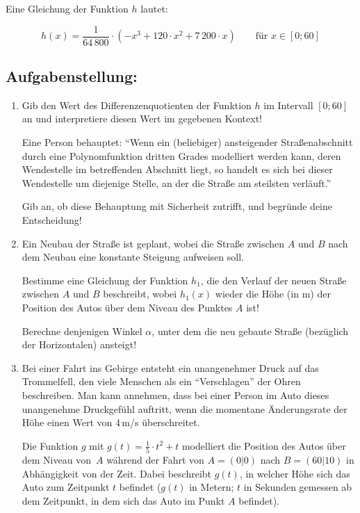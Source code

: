 \begin{langesbeispiel}
Eine Gleichung der Funktion $h$ lautet:

\[h(x)=\frac{1}{64\,800}\cdot(-x^3+120\cdot x^2+7\,200\cdot x) \qquad \text{für } x\in [0; 60] \]

\subsection{Aufgabenstellung:}

\begin{enumerate}
	\item Gib den Wert des Differenzenquotienten der Funktion $h$ im Intervall $[0; 60]$ an und interpretiere diesen Wert im gegebenen Kontext! \leer
	
Eine Person behauptet: "`Wenn ein (beliebiger) ansteigender Straßenabschnitt durch eine Polynomfunktion dritten Grades modelliert werden kann, deren Wendestelle im betreffenden
Abschnitt liegt, so handelt es sich bei dieser Wendestelle um diejenige Stelle, an der die Straße am steilsten verläuft."'\leer

Gib an, ob diese Behauptung mit Sicherheit zutrifft, und begründe deine Entscheidung!

\item Ein Neubau der Straße ist geplant, wobei die Straße zwischen $A$ und $B$ nach dem Neubau
eine konstante Steigung aufweisen soll.\leer

  Bestimme eine Gleichung der Funktion $h_1$, die den Verlauf der neuen Straße zwischen $A$ und $B$ beschreibt, wobei $h_1(x)$ wieder die Höhe (in m) der Position des Autos über
dem Niveau des Punktes $A$ ist!\leer

Berechne denjenigen Winkel $\alpha$, unter dem die neu gebaute Straße (bezüglich der Horizontalen) ansteigt!

\item Bei einer Fahrt ins Gebirge entsteht ein unangenehmer Druck auf das Trommelfell, den viele Menschen als ein "`Verschlagen"' der Ohren beschreiben. Man kann annehmen, dass bei einer Person im Auto dieses unangenehme Druckgefühl auftritt, wenn die momentane Änderungsrate der Höhe einen Wert von 4\,m/s überschreitet. \leer

Die Funktion $g$ mit $g(t)=\frac{1}{5}\cdot t^2+ t$ modelliert die Position des Autos über dem Niveau von $A$ während der Fahrt von $A = (0|0)$ nach $B = (60|10)$ in Abhängigkeit von der Zeit. Dabei beschreibt $g(t)$, in welcher Höhe sich das Auto zum Zeitpunkt $t$ befindet ($g(t)$ in Metern; $t$ in Sekunden gemessen ab dem Zeitpunkt, in dem sich das Auto im Punkt $A$ befindet).\leer


\end{enumerate}
\end{langesbeispiel}
